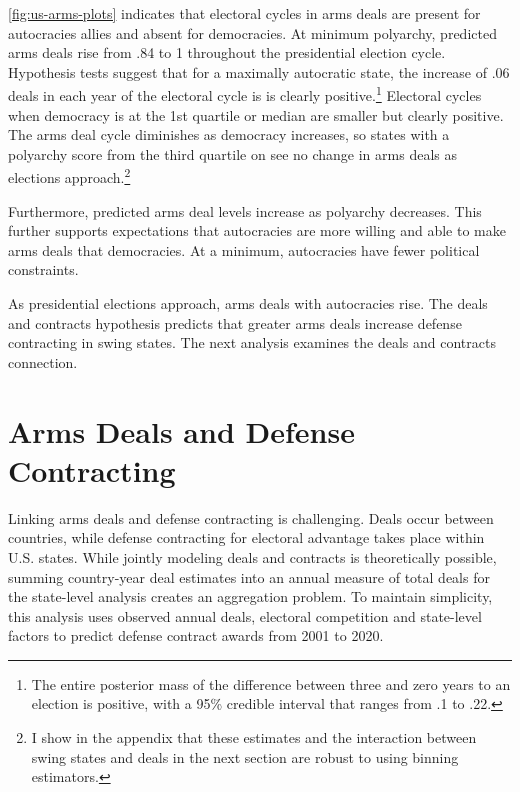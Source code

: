 \documentclass[12pt]{article}
\begin{document}
\autoref{fig:us-arms-plots} indicates that electoral cycles in arms deals are present for autocracies allies and absent for democracies.
At minimum polyarchy, predicted arms deals rise from .84 to 1 throughout the presidential election cycle.
Hypothesis tests suggest that for a maximally autocratic state, the increase of .06 deals in each year of the electoral cycle is is clearly positive.\footnote{The entire posterior mass of the difference between three and zero years to an election is positive, with a 95\% credible interval that ranges from .1 to .22.}
Electoral cycles when democracy is at the 1st quartile or median are smaller but clearly positive.
The arms deal cycle diminishes as democracy increases, so states with a polyarchy score from the third quartile on see no change in arms deals as elections approach.\footnote{I show in the appendix that these estimates and the interaction between swing states and deals in the next section are robust to using binning estimators.}  


Furthermore, predicted arms deal levels increase as polyarchy decreases. 
This further supports expectations that autocracies are more willing and able to make arms deals that democracies. 
At a minimum, autocracies have fewer political constraints. 


As presidential elections approach, arms deals with autocracies rise. 
The deals and contracts hypothesis predicts that greater arms deals increase defense contracting in swing states. 
The next analysis examines the deals and contracts connection.


\section{Arms Deals and Defense Contracting}


Linking arms deals and defense contracting is challenging. 
Deals occur between countries, while defense contracting for electoral advantage takes place within U.S. states.
While jointly modeling deals and contracts is theoretically possible, summing country-year deal estimates into an annual measure of total deals for the state-level analysis creates an aggregation problem. %
To maintain simplicity, this analysis uses observed annual deals, electoral competition and state-level factors to predict defense contract awards from 2001 to 2020. 
\end{document}
